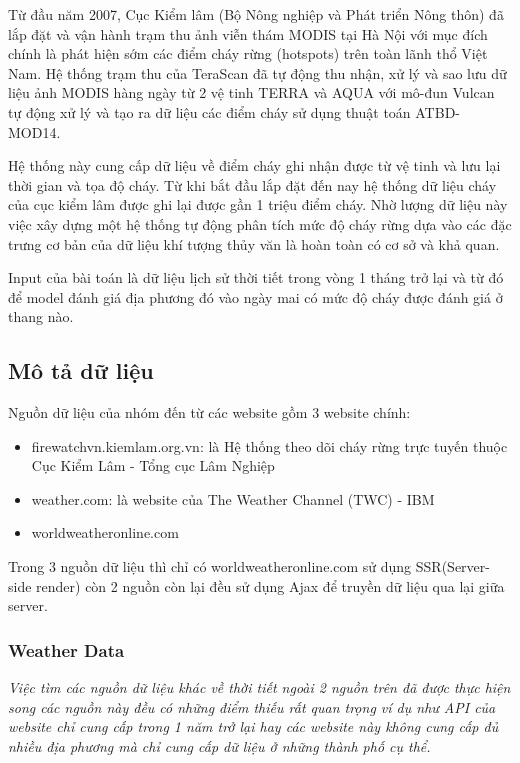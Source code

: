 \documentclass{article}
\begin{document}
Từ đầu năm 2007, Cục Kiểm lâm (Bộ Nông nghiệp và Phát triển Nông thôn) đã lắp đặt và vận hành trạm thu ảnh viễn thám MODIS tại Hà Nội với mục đích chính là phát hiện sớm các điểm cháy rừng (hotspots) trên toàn lãnh thổ Việt Nam. Hệ thống trạm thu của TeraScan đã tự động thu nhận, xử lý và sao lưu dữ liệu ảnh MODIS hàng ngày từ 2 vệ tinh TERRA và AQUA với mô-đun Vulcan tự động xử lý và tạo ra dữ liệu các điểm cháy sử dụng thuật toán ATBD-MOD14\cite{website:atbd-mod14}.

Hệ thống này cung cấp dữ liệu về điểm cháy ghi nhận được từ vệ tinh và lưu lại thời gian và tọa độ cháy. Từ khi bắt đầu lắp đặt đến nay hệ thống dữ liệu cháy của cục kiểm lâm được ghi lại được gần 1 triệu điểm cháy. Nhờ lượng dữ liệu này việc xây dựng một hệ thống tự động phân tích mức độ cháy rừng dựa vào các đặc trưng cơ bản của dữ liệu khí tượng thủy văn là hoàn toàn có cơ sở và khả quan.

Input của bài toán là dữ liệu lịch sử thời tiết trong vòng 1 tháng trở lại và từ đó để model đánh giá địa phương đó vào ngày mai có mức độ cháy được đánh giá ở thang nào.

\subsection{Mô tả dữ liệu}

Nguồn dữ liệu của nhóm đến từ các website gồm 3 website chính:

\begin{itemize}
	\item firewatchvn.kiemlam.org.vn: là Hệ thống theo dõi cháy rừng trực tuyến thuộc Cục Kiểm Lâm - Tổng cục Lâm Nghiệp
	\item weather.com: là website của The Weather Channel (TWC) - IBM\cite{website:wiki_twc}
	\item worldweatheronline.com
\end{itemize}

Trong 3 nguồn dữ liệu thì chỉ có worldweatheronline.com sử dụng SSR(Server-side render) còn 2 nguồn còn lại đều sử dụng Ajax để truyền dữ liệu qua lại giữa server.

\subsubsection{Weather Data}
\qquad\emph{Việc tìm các nguồn dữ liệu khác về thời tiết ngoài 2 nguồn trên đã được thực hiện song các nguồn này đều có những điểm thiếu rất quan trọng ví dụ như API của website chỉ cung cấp trong 1 năm trở lại hay các website này không cung cấp đủ nhiều địa phương mà chỉ cung cấp dữ liệu ở những thành phố cụ thể.}
\end{document}
